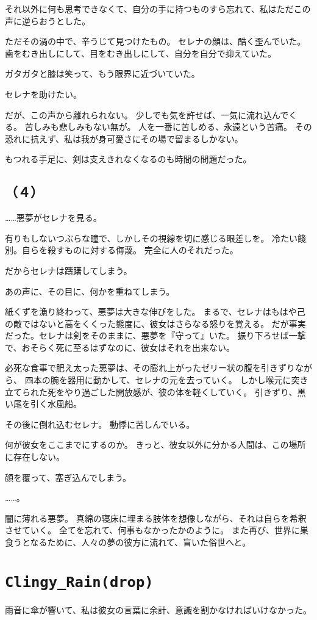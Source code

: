 \documentclass[../IHMain]{subfiles}
\begin{document}
それ以外に何も思考できなくて、自分の手に持つものすら忘れて、私はただこの声に逆らおうとした。

ただその渦の中で、辛うじて見つけたもの。
セレナの顔は、酷く歪んでいた。
歯をむき出しにして、目をむき出しにして、自分を自分で抑えていた。

ガタガタと膝は笑って、もう限界に近づいていた。

セレナを助けたい。

だが、この声から離れられない。
少しでも気を許せば、一気に流れ込んでくる。
苦しみも悲しみもない無が。
人を一番に苦しめる、永遠という苦痛。
その恐れに抗えず、私は我が身可愛さにその場で留まるしかない。

もつれる手足に、剣は支えきれなくなるのも時間の問題だった。

\subsection*{（４）}

……悪夢がセレナを見る。

有りもしないつぶらな瞳で、しかしその視線を切に感じる眼差しを。
冷たい餞別。自らを殺すものに対する侮蔑。
完全に人のそれだった。

だからセレナは躊躇してしまう。

あの声に、その目に、何かを重ねてしまう。

紙くずを漁り終わって、悪夢は大きな伸びをした。
まるで、セレナはもはや己の敵ではないと高をくくった態度に、彼女はさらなる怒りを覚える。
だが事実だった。セレナは剣をそのままに、悪夢を『守って』いた。
振り下ろせば一撃で、おそらく死に至るはずなのに、彼女はそれを出来ない。

必死な食事で肥え太った悪夢は、その膨れ上がったゼリー状の腹を引きずりながら、
四本の腕を器用に動かして、セレナの元を去っていく。
しかし喉元に突き立てられた死をやり過ごした開放感が、彼の体を軽くしていく。
引きずり、黒い尾を引く水風船。

その後に倒れ込むセレナ。
動悸に苦しんでいる。

何が彼女をここまでにするのか。
きっと、彼女以外に分かる人間は、この場所に存在しない。

顔を覆って、塞ぎ込んでしまう。

……。

闇に薄れる悪夢。
真綿の寝床に埋まる肢体を想像しながら、それは自らを希釈させていく。
全てを忘れて、何事もなかったかのように。
また再び、世界に巣食うとなるために、人々の夢の彼方に流れて、盲いた俗世へと。

\section*{\tt Clingy\_Rain(drop)}
雨音に傘が響いて、私は彼女の言葉に余計、意識を割かなければいけなかった。
\end{document}
